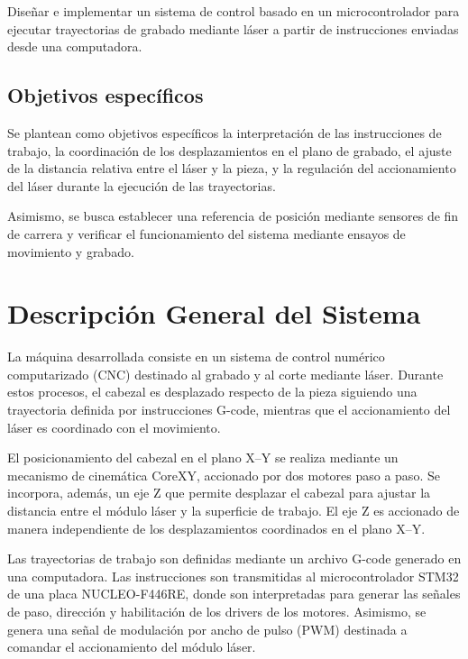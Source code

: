 \documentclass[blue,fullpaper]{ludusofficial}  %
\begin{document}
Diseñar e implementar un sistema de control basado en
un microcontrolador para ejecutar trayectorias de grabado
mediante láser a partir de instrucciones enviadas desde
una computadora.

\subsection{Objetivos específicos}

Se plantean como objetivos específicos la interpretación
de las instrucciones de trabajo, la coordinación de los
desplazamientos en el plano de grabado, el ajuste de la
distancia relativa entre el láser y la pieza, y la regulación
del accionamiento del láser durante la ejecución de las
trayectorias.

Asimismo, se busca establecer una referencia de posición
mediante sensores de fin de carrera y verificar el
funcionamiento del sistema mediante ensayos de movimiento
y grabado.



\section{Descripción General del Sistema}

La máquina desarrollada consiste en un sistema de control numérico computarizado (CNC) destinado al grabado y al corte mediante láser. Durante estos procesos, el cabezal es desplazado respecto de la pieza siguiendo una trayectoria definida por instrucciones G-code, mientras que el accionamiento del láser es coordinado con el movimiento.

El posicionamiento del cabezal en el plano X--Y se realiza mediante un mecanismo de cinemática CoreXY, accionado por dos motores paso a paso. Se incorpora, además, un eje Z que permite desplazar el cabezal para ajustar la distancia entre el módulo láser y la superficie de trabajo. El eje Z es accionado de manera independiente de los desplazamientos coordinados en el plano X--Y.

Las trayectorias de trabajo son definidas mediante un archivo G-code generado en una computadora. Las instrucciones son transmitidas al microcontrolador STM32 de una placa NUCLEO-F446RE, donde son interpretadas para generar las señales de paso, dirección y habilitación de los drivers de los motores. Asimismo, se genera una señal de modulación por ancho de pulso (PWM) destinada a comandar el accionamiento del módulo láser.
\end{document}
